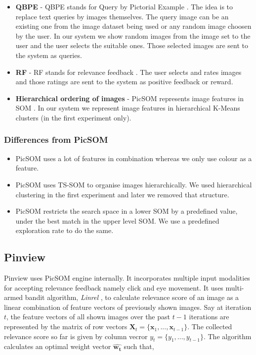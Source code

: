 \documentclass[english]{tktltiki}
\begin{document}
\begin{itemize}
	\item \textbf{QBPE} - QBPE stands for Query by Pictorial Example \cite{qbpe}. The idea is to replace text queries by images themselves. The query image can be an existing one from the image dataset being used or any random image choosen by the user. In our system we show random images from the image set to the user and the user selects the suitable ones. Those selected images are sent to the system as queries.
	\item \textbf{RF} - RF stands for relevance feedback \cite{rel_feed}. The user selects and rates images and those ratings are sent to the system as positive feedback or reward.
	\item \textbf{Hierarchical ordering of images} - PicSOM represents image features in SOM \cite{SOM}. In our system we represent image features in hierarchical K-Means \cite{k_means} clusters (in the first experiment only).
\end{itemize}

\subsubsection{Differences from PicSOM}

\begin{itemize}
	\item PicSOM uses a lot of features in combination whereas we only use colour as a feature.
	\item PicSOM uses TS-SOM to organise images hierarchically. We used hierarchical clustering in the first experiment and later we removed that structure.
	\item PicSOM restricts the search space in a lower SOM by a predefined value, under the best match in the upper level SOM. We use a predefined exploration rate to do the same.
\end{itemize}


\subsection{Pinview}

Pinview uses PicSOM engine internally. It incorporates multiple input modalities for accepting relevance feedback namely click and eye movement. It uses multi-armed bandit algorithm, \textit{Linrel} \cite{linrel}, to calculate relevance score of an image as a linear combination of feature vectors of previously shown images. Say at iteration $t$, the feature vectors of all shown images over the past $t-1$ iterations are represented by the matrix of row vectors $\mathbf{X}_t = \{\mathbf{x}_1, ..., \mathbf{x}_{t-1}\}$. The collected relevance score so far is given by column vecror $y_t = \{y_1, ..., y_{t-1}\}$. The algorithm calculates an optimal weight vector $\hat{\mathbf{w_t}}$ such that,
\end{document}
